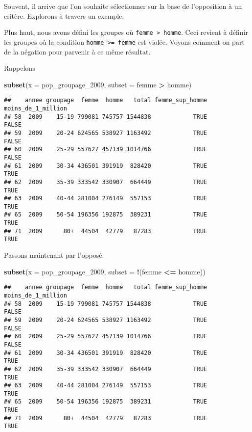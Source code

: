 \documentclass[]{book}
\newenvironment{Shaded}{\begin{snugshade}}{\end{snugshade}}
\newcommand{\KeywordTok}[1]{\textcolor[rgb]{0.13,0.29,0.53}{\textbf{#1}}}
\newcommand{\DataTypeTok}[1]{\textcolor[rgb]{0.13,0.29,0.53}{#1}}
\newcommand{\DecValTok}[1]{\textcolor[rgb]{0.00,0.00,0.81}{#1}}
\newcommand{\StringTok}[1]{\textcolor[rgb]{0.31,0.60,0.02}{#1}}
\newcommand{\OperatorTok}[1]{\textcolor[rgb]{0.81,0.36,0.00}{\textbf{#1}}}
\newcommand{\NormalTok}[1]{#1}
\begin{document}
Souvent, il arrive que l'on souhaite sélectionner sur la base de
l'opposition à un critère. Explorons à travers un exemple.

Plus haut, nous avons défini les groupes où
\texttt{femme\ \textgreater{}\ homme}. Ceci revient à définir les
groupes où la condition \texttt{homme\ \textgreater{}=\ femme} est
violée. Voyons comment on part de la négation pour parvenir à ce même
résultat.

Rappelons

\begin{Shaded}
\begin{Highlighting}[]
\KeywordTok{subset}\NormalTok{(}\DataTypeTok{x =}\NormalTok{ pop_groupage_}\DecValTok{2009}\NormalTok{, }\DataTypeTok{subset =}\NormalTok{ femme }\OperatorTok{>}\StringTok{ }\NormalTok{homme)}
\end{Highlighting}
\end{Shaded}

\begin{verbatim}
##    annee groupage  femme  homme   total femme_sup_homme moins_de_1_million
## 58  2009    15-19 799081 745757 1544838            TRUE              FALSE
## 59  2009    20-24 624565 538927 1163492            TRUE              FALSE
## 60  2009    25-29 557627 457139 1014766            TRUE              FALSE
## 61  2009    30-34 436501 391919  828420            TRUE               TRUE
## 62  2009    35-39 333542 330907  664449            TRUE               TRUE
## 63  2009    40-44 281004 276149  557153            TRUE               TRUE
## 65  2009    50-54 196356 192875  389231            TRUE               TRUE
## 71  2009      80+  44504  42779   87283            TRUE               TRUE
\end{verbatim}

Passons maintenant par l'opposé.

\begin{Shaded}
\begin{Highlighting}[]
\KeywordTok{subset}\NormalTok{(}\DataTypeTok{x =}\NormalTok{ pop_groupage_}\DecValTok{2009}\NormalTok{, }\DataTypeTok{subset =} \OperatorTok{!}\NormalTok{(femme }\OperatorTok{<=}\StringTok{ }\NormalTok{homme))}
\end{Highlighting}
\end{Shaded}

\begin{verbatim}
##    annee groupage  femme  homme   total femme_sup_homme moins_de_1_million
## 58  2009    15-19 799081 745757 1544838            TRUE              FALSE
## 59  2009    20-24 624565 538927 1163492            TRUE              FALSE
## 60  2009    25-29 557627 457139 1014766            TRUE              FALSE
## 61  2009    30-34 436501 391919  828420            TRUE               TRUE
## 62  2009    35-39 333542 330907  664449            TRUE               TRUE
## 63  2009    40-44 281004 276149  557153            TRUE               TRUE
## 65  2009    50-54 196356 192875  389231            TRUE               TRUE
## 71  2009      80+  44504  42779   87283            TRUE               TRUE
\end{verbatim}
\end{document}
